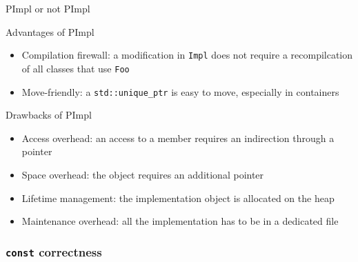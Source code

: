 \begin{frame}{PImpl or not PImpl}{}
  \begin{block}{Advantages of PImpl}
    \begin{itemize}
    \item
      Compilation firewall: a modification in \lstinline!Impl! does not require a recompilcation of all classes that use \lstinline!Foo!
    \item
      Move-friendly: a \lstinline!std::unique_ptr! is easy to move, especially in containers
    \end{itemize}
  \end{block}
  \begin{block}{Drawbacks of PImpl}
    \begin{itemize}
    \item
      Access overhead: an access to a member requires an indirection through a pointer
    \item
      Space overhead: the object requires an additional pointer
    \item
      Lifetime management: the implementation object is allocated on the heap
    \item
      Maintenance overhead: all the implementation has to be in a dedicated file
    \end{itemize}
  \end{block}
\end{frame}


\subsubsection{\texttt{const} correctness}

